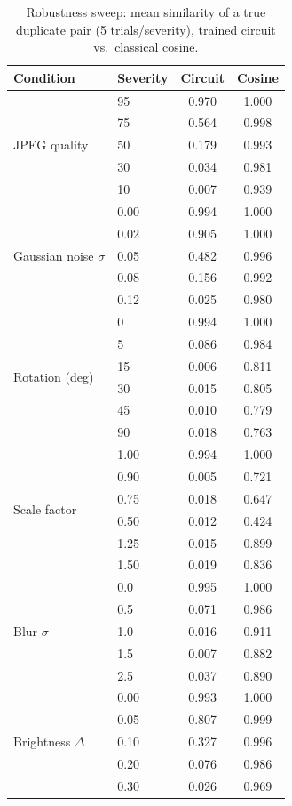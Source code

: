 \documentclass[conference]{IEEEtran}
\begin{document}
\begin{table}[t]
\centering
\caption{Robustness sweep: mean similarity of a true duplicate pair (5 trials/severity), trained circuit vs.\ classical cosine.}
\label{tab:robust}
\begin{tabular}{llcc}
\toprule
\textbf{Condition} & \textbf{Severity} & \textbf{Circuit} & \textbf{Cosine}\\
\midrule
\multirow{5}{*}{JPEG quality} & 95 & 0.970 & 1.000\\
 & 75 & 0.564 & 0.998\\
 & 50 & 0.179 & 0.993\\
 & 30 & 0.034 & 0.981\\
 & 10 & 0.007 & 0.939\\
\midrule
\multirow{5}{*}{Gaussian noise $\sigma$} & 0.00 & 0.994 & 1.000\\
 & 0.02 & 0.905 & 1.000\\
 & 0.05 & 0.482 & 0.996\\
 & 0.08 & 0.156 & 0.992\\
 & 0.12 & 0.025 & 0.980\\
\midrule
\multirow{6}{*}{Rotation (deg)} & 0 & 0.994 & 1.000\\
 & 5 & 0.086 & 0.984\\
 & 15 & 0.006 & 0.811\\
 & 30 & 0.015 & 0.805\\
 & 45 & 0.010 & 0.779\\
 & 90 & 0.018 & 0.763\\
\midrule
\multirow{6}{*}{Scale factor} & 1.00 & 0.994 & 1.000\\
 & 0.90 & 0.005 & 0.721\\
 & 0.75 & 0.018 & 0.647\\
 & 0.50 & 0.012 & 0.424\\
 & 1.25 & 0.015 & 0.899\\
 & 1.50 & 0.019 & 0.836\\
\midrule
\multirow{5}{*}{Blur $\sigma$} & 0.0 & 0.995 & 1.000\\
 & 0.5 & 0.071 & 0.986\\
 & 1.0 & 0.016 & 0.911\\
 & 1.5 & 0.007 & 0.882\\
 & 2.5 & 0.037 & 0.890\\
\midrule
\multirow{5}{*}{Brightness $\Delta$} & 0.00 & 0.993 & 1.000\\
 & 0.05 & 0.807 & 0.999\\
 & 0.10 & 0.327 & 0.996\\
 & 0.20 & 0.076 & 0.986\\
 & 0.30 & 0.026 & 0.969\\
\bottomrule
\end{tabular}
\end{table}
\end{document}
